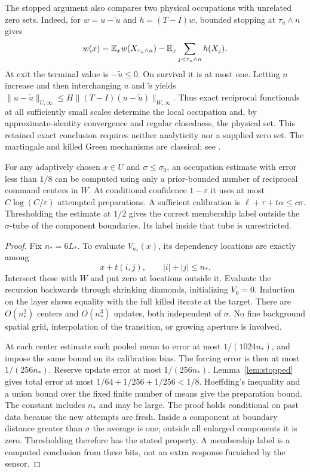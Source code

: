 The stopped argument also compares two physical occupations with
unrelated zero sets. Indeed, for $w=u-\widetilde u$ and
$h=(T-I)w$, bounded stopping at $\tau_u\wedge n$ gives
\[
 w(x)=\mathbb E_xw(X_{\tau_u\wedge n})
                 -\mathbb E_x\sum_{j<\tau_u\wedge n}h(X_j).
\]
At exit the terminal value is $-\widetilde u\le0$. On survival it
is at most one. Letting $n$ increase and then interchanging $u$ and
$\widetilde u$ yields $\|u-\widetilde u\|_{U,\infty}
\le H\|(T-I)(u-\widetilde u)\|_{W,\infty}$. Thus exact reciprocal
functionals at all sufficiently small scales determine the local
occupation and, by approximate-identity convergence and regular
closedness, the physical set. This retained exact conclusion requires
neither analyticity nor a supplied zero set. The martingale and killed
Green mechanisms are classical; see \cite{LawlerLimic}.

\begin{proposition}
\label{prop:query}
For any adaptively chosen $x\in U$ and $\sigma\le\sigma_0$, an
occupation estimate with error less than $1/8$ can be computed using
only a prior-bounded number of reciprocal command centers in $W$.
At conditional confidence $1-\varepsilon$ it uses at most
$C\log(C/\varepsilon)$ attempted preparations. A sufficient calibration
is $\ell+\tau+t\alpha\le c\sigma$. Thresholding the estimate at
$1/2$ gives the correct membership label outside the $\sigma$-tube
of the component boundaries. Its label inside that tube is unrestricted.
\end{proposition}
\begin{proof}
Fix $n_*=6L_*$. To evaluate $V_{n_*}(x)$, its dependency locations
are exactly among
\begin{equation}\label{eq:diamond}
 x+t(i,j),\qquad |i|+|j|\le n_*.
\end{equation}
Intersect these with $W$ and put zero at locations outside it. Evaluate
the recursion backwards through shrinking diamonds, initializing
$V_0=0$. Induction on the layer shows equality with the full killed
iterate at the target. There are $O(n_*^2)$ centers and $O(n_*^3)$
updates, both independent of $\sigma$. No fine background spatial grid,
interpolation of the transition, or growing aperture is involved.

At each center estimate each pooled mean to error at most
$1/(1024n_*)$, and impose the same bound on its calibration bias.
The forcing error is then at most $1/(256n_*)$. Reserve update error
at most $1/(256n_*)$. Lemma~\ref{lem:stopped} gives total error at most
$1/64+1/256+1/256<1/8$. Hoeffding's inequality and a union bound over
the fixed finite number of means give the preparation bound. The
constant includes $n_*$ and may be large. The proof holds conditional
on past data because the new attempts are fresh. Inside a component
at boundary distance greater than $\sigma$ the average is one;
outside all enlarged components it is zero. Thresholding therefore
has the stated property. A membership label is a computed conclusion
from these bits, not an extra response furnished by the sensor.
\end{proof}

